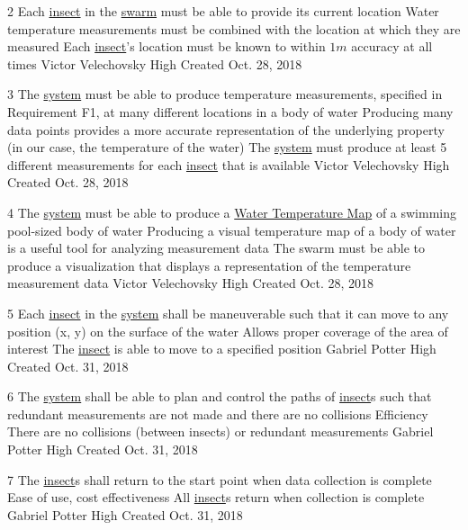 \documentclass[11pt]{article}
\begin{document}
\functionalRequirement
{2}
{Each \hyperref[sec:definitions]{insect} in the
\hyperref[sec:definitions]{swarm}
must be able to provide its current location}
{Water temperature measurements must be combined with the location
at which they are measured}
{Each \hyperref[sec:definitions]{insect}'s location must be known to within
$1m$ accuracy at all times}
{Victor Velechovsky}
{High}
{Created Oct. 28, 2018}

\functionalRequirement
{3}
{The \hyperref[sec:definitions]{system} must be able to produce temperature
measurements, specified in Requirement F1, at many different locations
in a body of water}
{Producing many data points provides a more accurate representation of the
underlying property (in our case, the temperature of the water)}
{The \hyperref[sec:definitions]{system} must produce at least 5 different
measurements for each \hyperref[sec:definitions]{insect} that is
available}
{Victor Velechovsky}
{High}
{Created Oct. 28, 2018}

\functionalRequirement
{4}
{The \hyperref[sec:definitions]{system} must be able to produce a \hyperref[sec:definitions]{Water Temperature Map} of a swimming pool-sized body of water}
{Producing a visual temperature map of a body of water is a useful
tool for analyzing measurement data}
{The swarm must be able to produce a visualization that displays a representation
of the temperature measurement data}
{Victor Velechovsky}
{High}
{Created Oct. 28, 2018}

\functionalRequirement
{5}
{Each \hyperref[sec:definitions]{insect} in the \hyperref[sec:definitions]{system} shall be maneuverable such that it can move to any position (x, y) on the surface of the water}
{Allows proper coverage of the area of interest}
{The \hyperref[sec:definitions]{insect} is able to move to a specified position}
{Gabriel Potter}
{High}
{Created Oct. 31, 2018}

\functionalRequirement
{6}
{The \hyperref[sec:definitions]{system} shall be able to plan and control the paths of \hyperref[sec:definitions]{insect}s such that redundant measurements are not made and there are no collisions}
{Efficiency}
{There are no collisions (between insects) or redundant measurements}
{Gabriel Potter}
{High}
{Created Oct. 31, 2018}

\functionalRequirement
{7}
{The \hyperref[sec:definitions]{insect}s shall return to the start point when data collection is complete}
{Ease of use, cost effectiveness}
{All \hyperref[sec:definitions]{insect}s return when collection is complete}
{Gabriel Potter}
{High}
{Created Oct. 31, 2018}
\end{document}
